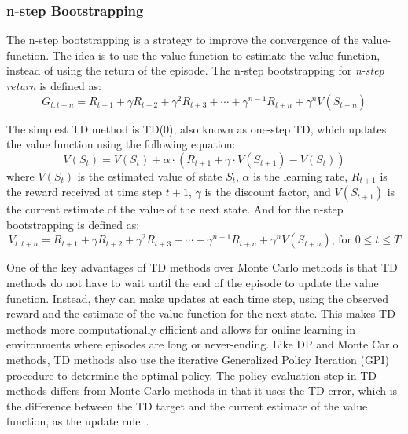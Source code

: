 \documentclass[../xlapes02]{subfiles}
\begin{document}
    \subsubsection{n-step Bootstrapping}\label{subsubsec:n-step-bootstrapping}
    The n-step bootstrapping is a strategy to improve the convergence of the value-function. The idea is to use the value-function to estimate the value-function, instead of using the return of the episode. The n-step bootstrapping for \emph{n-step return} is defined as:
    \begin{equation}
        G_{t:t+n} = R_{t+1} + \gamma R_{t+2} + \gamma^2 R_{t+3} + \cdots + \gamma^{n-1} R_{t+n} + \gamma^n V(S_{t+n})
    \end{equation}

    The simplest TD method is TD(0), also known as one-step TD, which updates the value function using the following equation:
    \begin{equation}
        V(S_t) = V(S_t) + \alpha \cdot (R_{t+1} + \gamma \cdot V(S_{t+1}) - V(S_t))
    \end{equation}
    where \( V(S_t) \) is the estimated value of state \( S_t \), \( \alpha \) is the learning rate, \( R_{t+1} \) is the reward received at time step \( t+1 \), \( \gamma \) is the discount factor, and \( V(S_{t+1}) \) is the current estimate of the value of the next state. And for the n-step bootstrapping is defined as:
    \begin{equation}
        V_{t:t+n} = R_{t+1} + \gamma R_{t+2} + \gamma^2 R_{t+3} + \cdots + \gamma^{n-1} R_{t+n} + \gamma^n V(S_{t+n})\text{, for }0\leq t \leq T
    \end{equation}

    One of the key advantages of TD methods over Monte Carlo methods is that TD methods do not have to wait until the end of the episode to update the value function. Instead, they can make updates at each time step, using the observed reward and the estimate of the value function for the next state. This makes TD methods more computationally efficient and allows for online learning in environments where episodes are long or never-ending. Like DP and Monte Carlo methods, TD methods also use the iterative Generalized Policy Iteration (GPI) procedure to determine the optimal policy. The policy evaluation step in TD methods differs from Monte Carlo methods in that it uses the TD error, which is the difference between the TD target and the current estimate of the value function, as the update rule~\cite{sutton2018reinforcement}.
\end{document}
